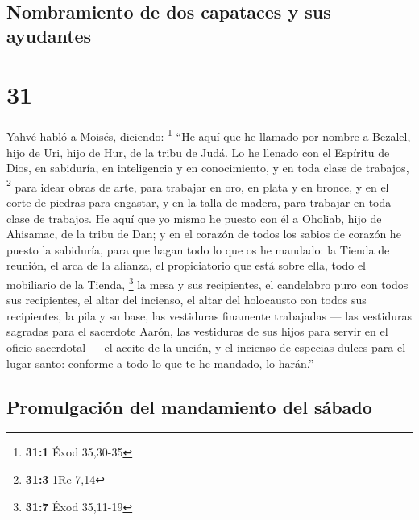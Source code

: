 \hypertarget{nombramiento-de-dos-capataces-y-sus-ayudantes}{%
\subsection{Nombramiento de dos capataces y sus
ayudantes}\label{nombramiento-de-dos-capataces-y-sus-ayudantes}}

\hypertarget{section-30}{%
\section{31}\label{section-30}}

 Yahvé habló a Moisés, diciendo: \footnote{\textbf{31:1}
  Éxod 35,30-35}  ``He aquí que he llamado por nombre a
Bezalel, hijo de Uri, hijo de Hur, de la tribu de Judá. 
Lo he llenado con el Espíritu de Dios, en sabiduría, en inteligencia y
en conocimiento, y en toda clase de trabajos, \footnote{\textbf{31:3}
  1Re 7,14}  para idear obras de arte, para trabajar en
oro, en plata y en bronce,  y en el corte de piedras para
engastar, y en la talla de madera, para trabajar en toda clase de
trabajos.  He aquí que yo mismo he puesto con él a
Oholiab, hijo de Ahisamac, de la tribu de Dan; y en el corazón de todos
los sabios de corazón he puesto la sabiduría, para que hagan todo lo que
os he mandado:  la Tienda de reunión, el arca de la
alianza, el propiciatorio que está sobre ella, todo el mobiliario de la
Tienda, \footnote{\textbf{31:7} Éxod 35,11-19}  la mesa y
sus recipientes, el candelabro puro con todos sus recipientes, el altar
del incienso,  el altar del holocausto con todos sus
recipientes, la pila y su base,  las vestiduras finamente
trabajadas --- las vestiduras sagradas para el sacerdote Aarón, las
vestiduras de sus hijos para servir en el oficio sacerdotal ---
 el aceite de la unción, y el incienso de especias dulces
para el lugar santo: conforme a todo lo que te he mandado, lo harán.''

\hypertarget{promulgaciuxf3n-del-mandamiento-del-suxe1bado}{%
\subsection{Promulgación del mandamiento del
sábado}\label{promulgaciuxf3n-del-mandamiento-del-suxe1bado}}

